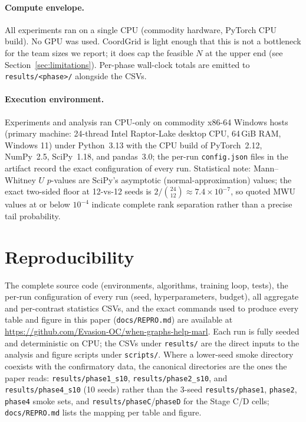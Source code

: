 \begin{appendices}
\paragraph{Compute envelope.} All experiments ran on a single CPU
(commodity hardware, PyTorch CPU build). No GPU was
used. CoordGrid is light enough that this is not a bottleneck for the
team sizes we report; it does cap the feasible $N$ at the upper
end (see Section~\ref{sec:limitations}). Per-phase wall-clock totals are
emitted to \texttt{results/<phase>/} alongside the CSVs.

\paragraph{Execution environment.} Experiments and analysis ran CPU-only on
commodity x86-64 Windows hosts (primary machine: 24-thread Intel Raptor-Lake
desktop CPU, 64\,GiB RAM, Windows 11) under Python~3.13 with the CPU build
of PyTorch~2.12, NumPy~2.5, SciPy~1.18, and pandas~3.0; the per-run
\texttt{config.json} files in the artifact record the exact configuration of
every run. Statistical note: Mann--Whitney $U$ $p$-values are SciPy's
asymptotic (normal-approximation) values; the exact two-sided floor at
12-vs-12 seeds is $2/\binom{24}{12} \approx 7.4\times10^{-7}$, so quoted
MWU values at or below $10^{-4}$ indicate complete rank separation rather
than a precise tail probability.

\section{Reproducibility}
\label{app:repro}

The complete source code (environments, algorithms, training loop, tests),
the per-run configuration of every run (seed, hyperparameters, budget), all
aggregate and per-contrast statistics CSVs, and the exact commands used to
produce every table and figure in this paper (\texttt{docs/REPRO.md}) are available at \url{https://github.com/Evasion-OC/when-graphs-help-marl}. Each run is fully seeded and
deterministic on CPU; the CSVs under \texttt{results/} are the direct inputs
to the analysis and figure scripts under \texttt{scripts/}. Where a
lower-seed smoke directory coexists with the confirmatory data, the
canonical directories are the ones the paper reads:
\texttt{results/phase1\_s10}, \texttt{results/phase2\_s10}, and
\texttt{results/phase4\_s10} (10 seeds) rather than the 3-seed
\texttt{results/phase1}, \texttt{phase2}, \texttt{phase4} smoke sets, and
\texttt{results/phaseC}/\texttt{phaseD} for the Stage C/D cells;
\texttt{docs/REPRO.md} lists the mapping per table and figure.


\end{appendices}
